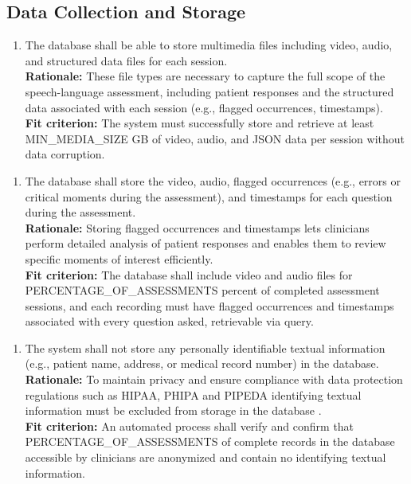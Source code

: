 \documentclass[12pt]{article}
\begin{document}
\subsection{Data Collection and Storage}
\begin{enumerate}[label={FR-DSC}1. ]
  \item The database shall be able to store multimedia files including video, audio, and structured data files for each session.\\
  \textbf{Rationale: }These file types are necessary to capture the full scope of the speech-language assessment, 
  including patient responses and the structured data associated with each session (e.g., flagged occurrences, 
  timestamps).\\
  \textbf{Fit criterion: }The system must successfully store and retrieve at least MIN\_MEDIA\_SIZE GB of video, audio, and JSON 
  data per session without data corruption.
\end{enumerate}
\begin{enumerate}[label={FR-DSC}2. ]
  \item The database shall store the video, audio, flagged occurrences (e.g., errors or critical moments
  during the assessment), and timestamps for each question during the assessment.\\
 \textbf{Rationale: }Storing flagged occurrences and timestamps lets clinicians perform detailed analysis 
 of patient responses and enables them to review specific moments of interest efficiently.\\
 \textbf{Fit criterion: }The database shall include video and audio files for PERCENTAGE\_OF\_ASSESSMENTS percent of completed assessment sessions,
  and each recording must have flagged occurrences and timestamps associated with every question asked, 
  retrievable via query.
\end{enumerate}
\begin{enumerate}[label={FR-DSC}3. ]
  \item The system shall not store any personally identifiable textual information (e.g., patient name, address, 
  or medical record number) in the database.\\
  \textbf{Rationale: }To maintain privacy and ensure compliance with data protection regulations such as HIPAA, 
  PHIPA and PIPEDA identifying textual information must be excluded from storage in the database \cite{hipaa}.\\
  \textbf{Fit criterion: }An automated process shall verify and confirm that PERCENTAGE\_OF\_ASSESSMENTS of complete records in the database 
  accessible by clinicians are anonymized and contain no identifying textual information.
\end{enumerate}
\end{document}
